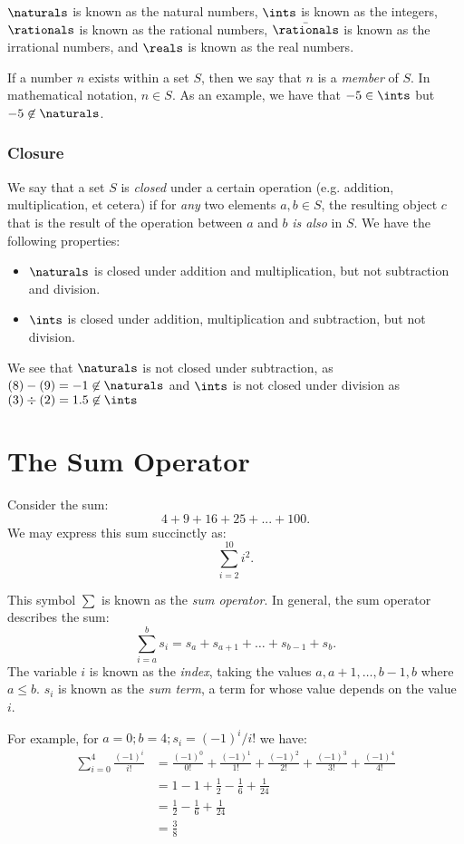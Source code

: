 \documentclass[../proofs.tex]{subfiles}
\begin{document}
  $\naturals$ is known as the natural numbers, $\ints$ is known as the integers, $\rationals$ is known as the rational numbers, $\bar{\rationals}$ is known as the irrational numbers, and $\reals$ is known as the real numbers.

  If a number $n$ exists within a set $S$, then we say that $n$ is a \emph{member} of $S$.
  In mathematical notation, $n \in S$. As an example, we have that $-5 \in \ints$ but $-5 \not\in \naturals$.

  \subsubsection*{Closure}
  We say that a set $S$ is \emph{closed} under a certain operation (e.g. addition, multiplication, et cetera)
  if for \emph{any} two elements $a, b \in S$, the resulting object $c$ that is the result of the
  operation between $a$ and $b$ \emph{is also} in $S$. We have the following properties:
  \begin{itemize}
    \item $\naturals$ is closed under addition and multiplication, but not subtraction and division.
    \item $\ints$ is closed under addition, multiplication and subtraction, but not division.
  \end{itemize}

  We see that $\naturals$ is not closed under subtraction, as $(8) - (9) = -1 \not \in \naturals$ and
  $\ints$ is not closed under division as $(3) \div (2) = 1.5 \not\in \ints $


\section{The Sum Operator}
  \newcommand{\negfrac}[1]{\frac{ (-1)^{#1} }{ #1! } }

  Consider the sum: $$ 4 + 9 + 16 + 25 + ... + 100. $$
  We may express this sum succinctly as: $$ \sum_{i=2}^{10}{i^2}. $$

  This symbol $\sum$ is known as the \emph{sum operator}. In general, the sum operator describes the sum: $$ \sum_{i=a}^{b}{s_i} = s_a + s_{a+1} + \ldots + s_{b-1} + s_b. $$
  The variable $i$ is known as the \emph{index}, taking the values $a, a+1, \ldots, b-1, b$ where $a \leq b$. $s_i$
  is known as the \emph{sum term}, a term for whose value depends on the value $i$.

  For example, for $a = 0; b = 4; s_i = (-1)^i/i!$ we have:
  \begin{align}
    \sum_{i=0}^{4}{\frac{(-1)^i}{i!}} &= \negfrac{0} + \negfrac{1} + \negfrac{2} + \negfrac{3} + \negfrac{4}  \label{prelim: eq: sumcos} \\
                                      &= 1 - 1 + \frac{1}{2} - \frac{1}{6} + \frac{1}{24} \\
                                      &= \frac{1}{2} - \frac{1}{6} + \frac{1}{24} \\
                                      &= \frac{3}{8}
  \end{align}
\end{document}
